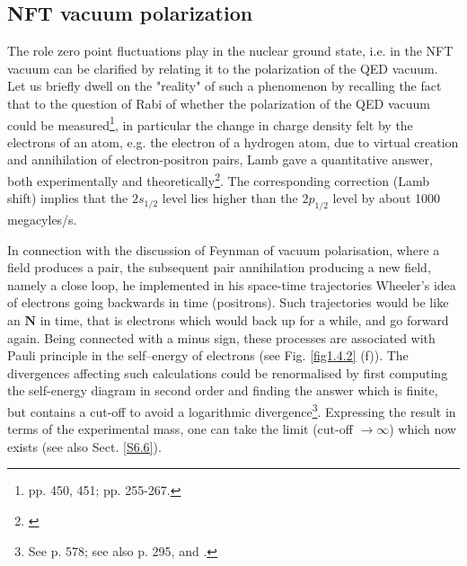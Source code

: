 \begin{subappendices}
 \section{NFT vacuum polarization}\label{App1.E}
 The role zero point fluctuations play in the nuclear ground state, i.e. in the NFT vacuum  can
 be  clarified by relating it to the polarization of the QED vacuum.
 Let us briefly dwell on the "reality" of such a phenomenon by recalling the fact that
 to the question of Rabi of whether the polarization of the QED vacuum could be measured\footnote{\cite{Pais:86} pp. 450, 451; \cite{Pais:00} pp. 255-267.}, in particular
 the change in charge  density felt by the electrons of an atom,  e.g. the electron of a hydrogen atom, due to
 virtual creation and annihilation of electron-positron pairs,  Lamb gave a quantitative answer, both experimentally
 and theoretically\footnote{\cite{Lamb:47,Kroll:49}}. The corresponding correction  (Lamb shift) implies that the $2s_{1/2}$ level lies 
 higher than the $2p_{1/2}$ level by about 1000 megacyles/s.  
 
 In connection with the discussion of Feynman of vacuum polarisation, where a field produces a pair,
 the subsequent pair annihilation producing a new field, namely a close loop, he implemented in his space-time trajectories 
 Wheeler's idea of electrons going backwards in time (positrons).  Such trajectories would be like an $\mathbf N$ in time,
 that is electrons which would back up for a while, and go forward again. Being connected 
 with a minus sign, these processes are associated with Pauli principle in the self--energy of electrons
 (see Fig. \ref{fig1.4.2} (f)). 
 The divergences affecting
 such calculations  could be renormalised by first computing the self-energy  diagram in second order and finding the answer which is finite, but contains a cut-off
 to avoid a logarithmic divergence\footnote{See \cite{Bethe:47,Feynman:61b,Weinberg:96} p. 578; see also \cite{Mehra:96} p. 295, and \cite{Bjorken:98}.}. Expressing the result in terms of the experimental mass, one can take 
 the limit (cut-off $\to \infty$) which now exists (see also Sect. \ref{S6.6}).
  

\end{subappendices}
